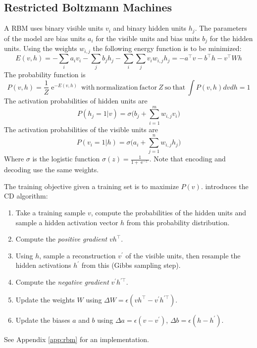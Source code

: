 \documentclass[a4paper,twoside,10pt]{article}
\begin{document}
\subsection{Restricted Boltzmann Machines}
A \ac{RBM} uses binary visible units $v_i$ and binary hidden units $h_j$.
The parameters of the model are bias units $a_i$ for the visible units and bias units $b_j$ for the hidden units.
Using the weights $w_{i,j}$ the following energy function is to be minimized\citep{wiki:rbm}:
\begin{equation*}
  E(v,h)=-\sum_ia_iv_i-\sum_jb_jh_j-\sum_i\sum_jv_iw_{i,j}h_j=-a^\top v-b^\top h-v^\top Wh
\end{equation*}
The probability function is
\begin{equation*}
  P(v,h)=\frac{1}{Z}\operatorname{e}^{-E(v,h)}\mathrm{\ with\ normalization\ factor\ }Z\mathrm{\ so\ that\ }\int P(v,h)dvdh=1
\end{equation*}
The activation probabilities of hidden units are
\begin{equation*}
  P(h_j=1|v)=\sigma\big(b_j+\sum_{i=1}^mw_{i,j}v_i\big)
\end{equation*}
The activation probabilities of the visible units are
\begin{equation*}
  P(v_i=1|h)=\sigma\big(a_i+\sum_{j=1}^nw_{i,j}h_j\big)
\end{equation*}
Where $\sigma$ is the logistic function $\sigma(z)=\frac{1}{1+\operatorname{e}^{-z}}$.
Note that encoding and decoding use the same weights.

The training objective given a training set is to maximize $P(v)$.
\citep{hinton2006training} introduces the \ac{CD} algorithm\citep{wiki:rbm}:
\begin{enumerate}
  \item Take a training sample $v$, compute the probabilities of the hidden units and sample a hidden activation vector $h$ from this probability distribution.
  \item Compute the \emph{positive gradient} $vh^\top$.
  \item Using $h$, sample a reconstruction $v^\prime$ of the visible units, then resample the hidden activations $h^\prime$ from this (Gibbs sampling step).
  \item Compute the \emph{negative gradient} $v^\prime h^{\prime\top}$.
  \item Update the weights $W$ using $\Delta W=\epsilon(vh^\top-v^\prime h^{\prime\top})$.
  \item Update the biases $a$ and $b$ using $\Delta a=\epsilon(v-v^\prime)$, $\Delta b=\epsilon(h-h^\prime)$.
\end{enumerate}
See Appendix \ref{app:rbm} for an implementation.
\end{document}
